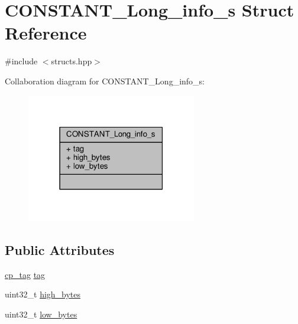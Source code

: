 \hypertarget{structCONSTANT__Long__info__s}{\section{C\+O\+N\+S\+T\+A\+N\+T\+\_\+\+Long\+\_\+info\+\_\+s Struct Reference}
\label{structCONSTANT__Long__info__s}
}


{\ttfamily \#include $<$structs.\+hpp$>$}



Collaboration diagram for C\+O\+N\+S\+T\+A\+N\+T\+\_\+\+Long\+\_\+info\+\_\+s\+:\nopagebreak
\begin{figure}[H]
\begin{center}
\leavevmode
\includegraphics[width=210pt]{structCONSTANT__Long__info__s__coll__graph}
\end{center}
\end{figure}
\subsection*{Public Attributes}
\begin{DoxyCompactItemize}
\item 
\hyperlink{structs_8hpp_a17947ec3f3c1f2392eabd36c1ba5fec6}{cp\+\_\+tag} \hyperlink{structCONSTANT__Long__info__s_abdc4201e4bf9eac8c7d632983cccedd3}{tag}
\item 
uint32\+\_\+t \hyperlink{structCONSTANT__Long__info__s_ae75d18eb47743d41d6a12698a0a9919e}{high\+\_\+bytes}
\item 
uint32\+\_\+t \hyperlink{structCONSTANT__Long__info__s_a221f2f424e3fcec977b0375a1ce1986b}{low\+\_\+bytes}
\end{DoxyCompactItemize}


